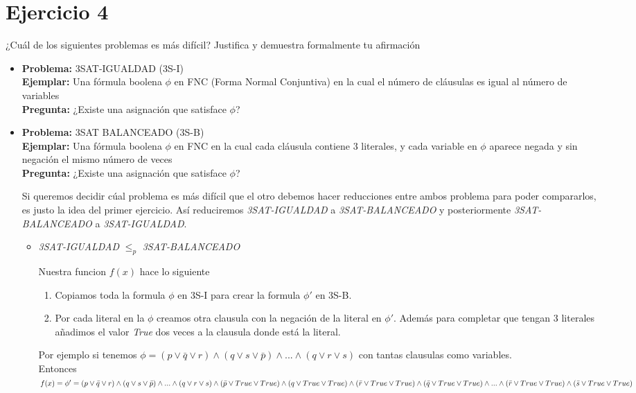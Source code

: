 \documentclass[12pt,letterpaper]{article}
\begin{document}
\section*{Ejercicio 4}
¿Cuál de los siguientes problemas es más difícil? Justifica y demuestra formalmente tu
afirmación
\begin{itemize}
    \item \textbf{Problema:} 3SAT-IGUALDAD (3S-I) \\
    \textbf{Ejemplar:} Una fórmula boolena $\phi$ en FNC (Forma Normal Conjuntiva) en la cual el número de cláusulas es igual al número de variables\\
    \textbf{Pregunta:} ¿Existe una asignación que satisface $\phi$?
    
    \item \textbf{Problema:} 3SAT BALANCEADO (3S-B)\\
    \textbf{Ejemplar:} Una fórmula boolena $\phi$ en FNC en la cual cada cláusula contiene 3 literales, y cada variable en $\phi$ aparece negada y sin negación el mismo número de veces\\
    \textbf{Pregunta:} ¿Existe una asignación que satisface $\phi$?
    
    Si queremos decidir cúal problema es más difícil que el otro debemos hacer reducciones entre ambos problema para poder compararlos, es justo la idea del primer ejercicio. Así reduciremos \textit{3SAT-IGUALDAD} a \textit{3SAT-BALANCEADO} y posteriormente \textit{3SAT-BALANCEADO} a \textit{3SAT-IGUALDAD}.
    \begin{itemize}[$\heartsuit$]
        \item \textit{3SAT-IGUALDAD} $\leq_p$ \textit{3SAT-BALANCEADO}
        
        Nuestra funcion $f(x)$ hace lo siguiente
        \begin{enumerate}
            \item Copiamos toda la formula $\phi$ en 3S-I para crear la formula $\phi'$ en 3S-B.
            
            \item Por cada literal en la $\phi$ creamos otra clausula con la negación de la literal en $\phi'$. Además para completar que tengan 3 literales añadimos el valor \textit{True} dos veces a la clausula donde está la literal.
        \end{enumerate}
        \newpage
        Por ejemplo si tenemos $\phi = (p \vee \bar{q} \vee r) \wedge (q \vee s \vee \bar{p}) \wedge ... \wedge (q \vee r \vee s)$ con tantas clausulas como variables.\\ Entonces $f(x) = \phi' = (p \vee \bar{q} \vee r) \wedge (q \vee s \vee \bar{p}) \wedge ... \wedge (q \vee r \vee s)
        \\ \wedge (\bar{p} \vee True \vee True) \wedge (q \vee True \vee True) \wedge(\bar{r} \vee True \vee True) \wedge(\bar{q} \vee True \vee True)\wedge ...  \wedge (\bar{r} \vee True \vee True)\wedge (\bar{s} \vee True \vee True)$
        

\end{itemize}
\end{itemize}
\end{document}
